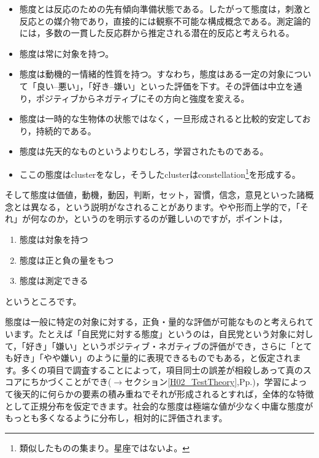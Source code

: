 \documentclass{ltjsbook}
\begin{document}
\begin{itemize}
    \item 態度とは反応のための先有傾向準備状態である。したがって態度は，刺激と反応との媒介物であり，直接的には観察不可能な構成概念である。測定論的には，多数の一貫した反応群から推定される潜在的反応と考えられる。
    \item 態度は常に対象を持つ。
    \item 態度は動機的ー情緒的性質を持つ。すなわち，態度はある一定の対象について「良い--悪い」，「好き--嫌い」といった評価を下す。その評価は中立を通り，ポジティブからネガティブにその方向と強度を変える。
    \item 態度は一時的な生物体の状態ではなく，一旦形成されると比較的安定しており，持続的である。
    \item 態度は先天的なものというよりむしろ，学習されたものである。
    \item ここの態度はclusterをなし，そうしたclusterはconstellation\footnote{類似したものの集まり。星座ではないよ。}を形成する。
\end{itemize}

そして態度は価値，動機，動因，判断，セット，習慣，信念，意見といった諸概念とは異なる，という説明がなされることがあります。やや形而上学的で，「それ」が何なのか，というのを明示するのが難しいのですが，ポイントは，
\begin{enumerate}
    \item 態度は対象を持つ
    \item 態度は正と負の量をもつ
    \item 態度は測定できる
\end{enumerate}
というところです。

態度は一般に特定の対象に対する，正負・量的な評価が可能なものと考えられています。たとえば「自民党に対する態度」というのは，自民党という対象に対して，「好き」「嫌い」というポジティブ・ネガティブの評価ができ，さらに「とても好き」「やや嫌い」のように量的に表現できるものでもある，と仮定されます。多くの項目で調査することによって，項目同士の誤差が相殺しあって真のスコアにちかづくことができ($\to$セクション\ref{H02_TestTheory},Pp.\pageref{H02_TestTheory})，学習によって後天的に何らかの要素の積み重ねでそれが形成されるとすれば，全体的な特徴として正規分布を仮定できます。社会的な態度は極端な値が少なく中庸な態度がもっとも多くなるように分布し，相対的に評価されます。
\end{document}
